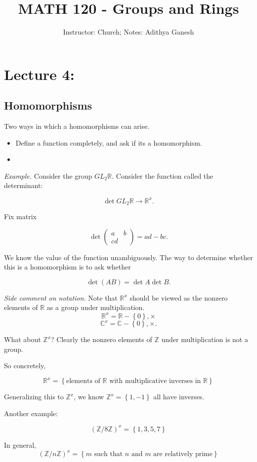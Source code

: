 \documentclass[12pt]{article}
\title{MATH 120 - Groups and Rings}
\author{Instructor: Church; Notes: Adithya Ganesh}
\newcommand{\RR}{\mathbb{R}}
\newcommand*{\mat}[1]{\begin{pmatrix}#1\end{pmatrix}}
\def\CC{\mathbb{C}}
\def\ZZ{\mathbb{Z}}
\newcommand*{\mat}[1]{\begin{pmatrix}#1\end{pmatrix}}
\begin{document}
\maketitle
\tableofcontents

\section{Lecture 4: }

\subsection{Homomorphisms}

Two ways in which a homomorphisms can arise.

\begin{itemize}
  \item Define a function completely, and ask if its a homomorphism.
  \item 
\end{itemize}

{\it Example.} Consider the group $GL_2 \RR$.  Consider the function called the determinant:

\[
  \det GL_2 \RR \to \RR^x.
\]

Fix matrix

\[
  \det \mat{a & b \\ c d} = ad - bc.
\]

We know the value of the function unambiguously.  The way to determine whether this is a homomorphism is to ask whether

\[
  \det (AB) = \det A \det B.
\]

{\it Side comment on notation.}  Note that $\RR^x$ should be viewed as the nonzero elements of $\RR$ as a group under multiplication.
\[
  \RR^x = \RR - \left\{ 0 \right\}, \times
\]
\[
  \CC^x = \CC - \left\{ 0 \right\}, \times.
\]

What about $\ZZ^x$?  Clearly the nonzero elements of $\ZZ$ under multiplication is not a group.


So concretely,

\[
  \RR^x = \left\{ \text{elements of $\RR$ with multiplicative inverses in $\RR$} \right\}
\]

Generalizing this to $\ZZ^x$, we know $\ZZ^x = \left\{ 1, -1 \right\}$ all have inverses.

Another example:

\[
  (\ZZ / 8 \ZZ)^{x} = \left\{ 1, 3, 5, 7 \right\}
\]

In general,
\[
  (\ZZ / n \ZZ)^{x} = \left\{ m \text{ such that $n$ and $m$ are relatively prime} \right\}
\]
\end{document}
